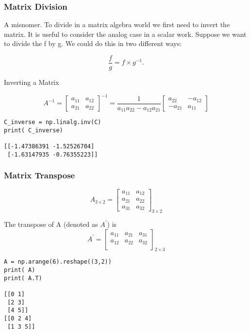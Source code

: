  \begin{frame}[fragile] \frametitle{Matrix Division}

A misnomer. To divide in a matrix algebra world we first need to invert the matrix. It is useful to consider the analog case in a scalar work. Suppose we want to divide the f by g. We could do this in two different ways:

\begin{equation}
    \frac{f}{g}=f \times g^{-1}.
\end{equation}

Inverting a Matrix

\begin{equation}
    A^{-1}=\begin{bmatrix}
             a_{11} & a_{12} \\
             a_{21} & a_{22} 
           \end{bmatrix}^{-1}=\frac{1}{a_{11}a_{22}-a_{12}a_{21}}   \begin{bmatrix}
                     a_{22} & -a_{12} \\
                     -a_{21} & a_{11} 
                   \end{bmatrix}
\end{equation}

\begin{lstlisting}
C_inverse = np.linalg.inv(C)
print( C_inverse)

[[-1.47386391 -1.52526704]
 [-1.63147935 -0.76355223]]
\end{lstlisting}

\end{frame}

 \begin{frame}[fragile] \frametitle{Matrix Transpose}

\begin{equation}
    A_{3 \times 2}=\begin{bmatrix}
      a_{11} & a_{12} \\
      a_{21} & a_{22} \\
      a_{31} & a_{32}   
    \end{bmatrix}_{3 \times 2}  
\end{equation}

The transpose of A (denoted as $A^{\prime}$) is
\begin{equation}
   A^{\prime}=\begin{bmatrix}
      a_{11} & a_{21} & a_{31} \\
      a_{12} & a_{22} & a_{32} \\
    \end{bmatrix}_{2 \times 3}
\end{equation}

\begin{lstlisting}
A = np.arange(6).reshape((3,2))
print( A)
print( A.T)

[[0 1]
 [2 3]
 [4 5]]
[[0 2 4]
 [1 3 5]]
\end{lstlisting}

\end{frame}

